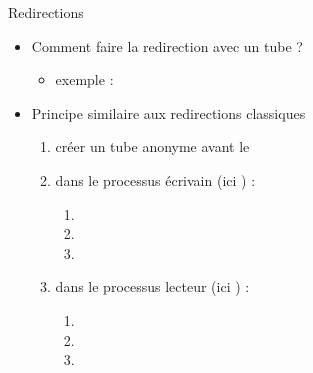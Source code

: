 \begin {frame} {Redirections}

    \begin {itemize}
	\item Comment faire la redirection avec un tube ?
	    \begin {itemize}
		\item exemple : 
	    \end {itemize}

	\item Principe similaire aux redirections classiques
	    \begin {enumerate}
		\item créer un tube anonyme avant le 
		\item dans le processus écrivain (ici ) :
		    \begin {enumerate}
			\item {}
			\item {}
			\item {}
		    \end {enumerate}
		\item dans le processus lecteur (ici ) :
		    \begin {enumerate}
			\item {}
			\item {}
			\item {}
		    \end {enumerate}
	    \end {enumerate}
    \end {itemize}
\end {frame}
